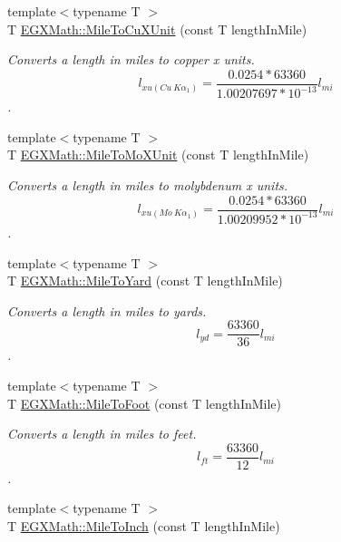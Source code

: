 \begin{DoxyCompactItemize}
{\footnotesize template$<$typename T $>$ }\\T \mbox{\hyperlink{group___e_g_x_math-_conversions-_length_conversions-_imperial-_mile-_non-_s_i_ga63bec635d857da530046d1c5a165b1d8}{E\+G\+X\+Math\+::\+Mile\+To\+Cu\+X\+Unit}} (const T length\+In\+Mile)
\begin{DoxyCompactList}\small\item\em Converts a length in miles to copper x units. \[ l_{xu(Cu\ K\alpha_1)}=\frac{0.0254 * 63360}{1.00207697*10^{-13}} l_{mi}\]. \end{DoxyCompactList}\item 
{\footnotesize template$<$typename T $>$ }\\T \mbox{\hyperlink{group___e_g_x_math-_conversions-_length_conversions-_imperial-_mile-_non-_s_i_gadefb09bf42157adb9c7a458b93e3a851}{E\+G\+X\+Math\+::\+Mile\+To\+Mo\+X\+Unit}} (const T length\+In\+Mile)
\begin{DoxyCompactList}\small\item\em Converts a length in miles to molybdenum x units. \[ l_{xu(Mo\ K\alpha_1)}=\frac{0.0254 * 63360}{1.00209952*10^{-13}} l_{mi}\]. \end{DoxyCompactList}\item 
{\footnotesize template$<$typename T $>$ }\\T \mbox{\hyperlink{group___e_g_x_math-_conversions-_length_conversions-_imperial-_mile-_imperial_ga21dab1c2a6d7ef3bbf0d611ce5665018}{E\+G\+X\+Math\+::\+Mile\+To\+Yard}} (const T length\+In\+Mile)
\begin{DoxyCompactList}\small\item\em Converts a length in miles to yards. \[ l_{yd}= \frac{63360}{36} l_{mi} \]. \end{DoxyCompactList}\item 
{\footnotesize template$<$typename T $>$ }\\T \mbox{\hyperlink{group___e_g_x_math-_conversions-_length_conversions-_imperial-_mile-_imperial_gafdc7f1f7887e48f18cb0d324b719a677}{E\+G\+X\+Math\+::\+Mile\+To\+Foot}} (const T length\+In\+Mile)
\begin{DoxyCompactList}\small\item\em Converts a length in miles to feet. \[ l_{ft}= \frac{63360}{12} l_{mi} \]. \end{DoxyCompactList}\item 
{\footnotesize template$<$typename T $>$ }\\T \mbox{\hyperlink{group___e_g_x_math-_conversions-_length_conversions-_imperial-_mile-_imperial_gaa00476d5ed2d329e62b2e68c283b6046}{E\+G\+X\+Math\+::\+Mile\+To\+Inch}} (const T length\+In\+Mile)

\end{DoxyCompactItemize}
